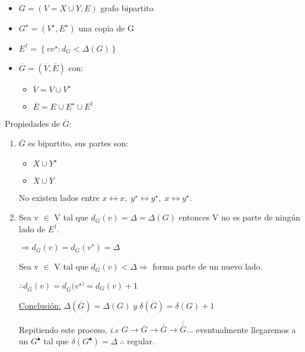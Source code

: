 \documentclass[12pt,a4paper]{report}
\begin{document}
		\begin{itemize}
			\item $G = (V = X \cup Y, E)$ grafo bipartito
			\item $G^{\star} = (V^{\star}, E^{\star})$ una copia de G
			\item $E^{\dag} = \left\lbrace vv^{\star} : d_{G} < \Delta(G) \right\rbrace$
			\item $\overline{G} = (\overline{V}, \overline{E})$ con:
				\begin{itemize}
					\item $\overline{V} = V \cup V^{\star}$
					\item $\overline{E} = E \cup E^{\star} \cup E^{\dag}$
				\end{itemize}
		\end{itemize}

		Propiedades de $\overline{G}$:
		\begin{enumerate}
			\item $\overline{G}$ es bipartito, sus partes son:
				\begin{itemize}
					\item $X \cup Y^{\star}$
					\item $X \cup Y$
				\end{itemize}

			No existen lados entre $x \leftrightarrow x, \; y^{\star} \leftrightarrow y^{\star}, \; x \leftrightarrow y^{\star}$.

			\item Sea v $\in$ V tal que $d_{G}(v) = \Delta = \Delta(G)$ entonces V no es parte de ningún lado de $E^{\dag}$.

			$\Rightarrow d_{\overline{G}}(v) = d_{\overline{G}}(v^{\star}) = \Delta$

			\vspace{5mm}
			Sea v $\in$ V tal que $d_{G}(v) < \Delta \Rightarrow$ forma parte de un nuevo lado.

			$\therefore d_{\overline{G}}(v) = d_{\overline{G}}(v^{\star)} = d_{G}(v) + 1$

			\underline{Conclusión:} $ \Delta(\overline{G}) = \Delta(G) \; y \; \delta(\overline{G}) = \delta(G) + 1$

			Repitiendo este proceso, \textit{i.e} $G \rightarrow \overline{G} \rightarrow \overline{\overline{G}} \rightarrow \overline{\overline{\overline{G}}} \dotsc $ eventualmente llegaremos a un $G^{\blacktriangle}$ tal que $\delta(G^{\blacktriangle}) = \Delta \; \therefore $ regular.
		\end{enumerate}
\end{document}
